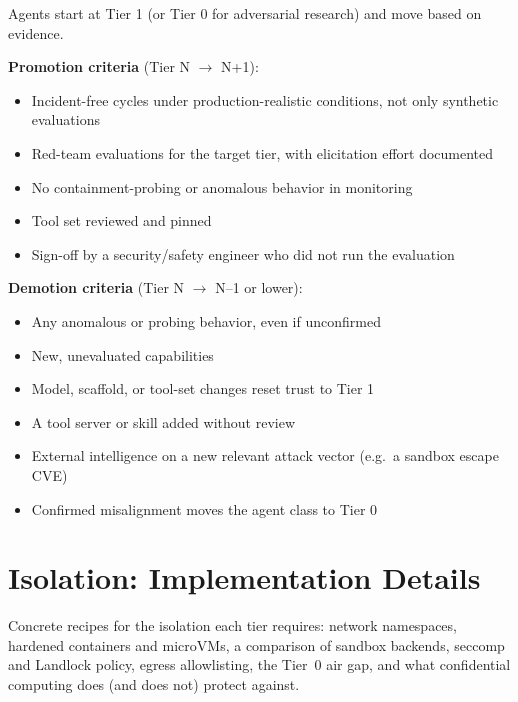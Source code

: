 \documentclass[11pt,letterpaper]{article}
\begin{document}
\begin{keybox}
Agents start at Tier 1 (or Tier 0 for adversarial research) and move based on evidence.

\textbf{Promotion criteria} (Tier N $\rightarrow$ N+1):
\begin{itemize}
  \item Incident-free cycles under production-realistic conditions, not only synthetic evaluations
  \item Red-team evaluations for the target tier, with elicitation effort documented
  \item No containment-probing or anomalous behavior in monitoring
  \item Tool set reviewed and pinned
  \item Sign-off by a security/safety engineer who did not run the evaluation
\end{itemize}

\textbf{Demotion criteria} (Tier N $\rightarrow$ N--1 or lower):
\begin{itemize}
  \item Any anomalous or probing behavior, even if unconfirmed
  \item New, unevaluated capabilities
  \item Model, scaffold, or tool-set changes reset trust to Tier 1
  \item A tool server or skill added without review
  \item External intelligence on a new relevant attack vector (e.g.\ a sandbox escape CVE)
  \item Confirmed misalignment moves the agent class to Tier 0
\end{itemize}
\end{keybox}


\section{Isolation: Implementation Details}
\label{sec:isolation}

\begin{glance}
Concrete recipes for the isolation each tier requires: network namespaces, hardened containers and microVMs, a comparison of sandbox backends, seccomp and Landlock policy, egress allowlisting, the Tier~0 air gap, and what confidential computing does (and does not) protect against.
\end{glance}
\end{document}
